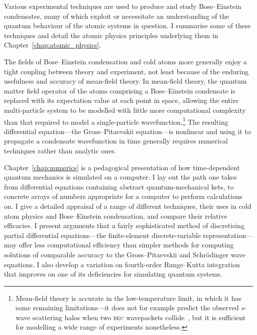 Various experimental techniques are used to produce and study Bose--Einstein condensates, many of which exploit or necessitate an understanding of the quantum behaviour of the atomic systems in question. I summarise some of these techniques and detail the atomic physics principles underlying them in Chapter~\ref{chap:atomic_physics}.

The fields of Bose--Einstein condensation and cold atoms more generally enjoy a tight coupling between theory and experiment, not least because of the enduring usefulness and accuracy of mean-field theory. In mean-field theory, the quantum matter field operator of the atoms comprising a Bose--Einstein condensate is replaced with its expectation value at each point in space, allowing the entire multi-particle system to be modelled with little more computational complexity than that required to model a single-particle wavefunction.\footnote{Mean-field theory is accurate in the low-temperature limit, in which it has some remaining limitations---it does not for example predict the observed $s$-wave scattering halos when two \textsc{bec} wavepackets collide~\cite{norrie_quantum_2006}, but it is sufficient for modelling a  wide range of experiments nonetheless.} The resulting differential equation---the Gross--Pitaevskii equation---is nonlinear and using it to propagate a condensate wavefunction in time generally requires numerical techniques rather than analytic ones.

Chapter~\ref{chap:numerics} is a pedagogical presentation of how time-dependent quantum mechanics is simulated on a computer. I lay out the path one takes from differential equations containing abstract quantum-mechanical kets, to concrete arrays of numbers appropriate for a computer to perform calculations on. I give a detailed appraisal of a range of different techniques, their uses in cold atom physics and Bose--Einstein condensation, and compare their relative efficacies. I present arguments that a fairly sophisticated method of discretising partial differential equations---the finite-element discrete-variable representation---may offer less computational efficiency than simpler methods for computing solutions of comparable accuracy to the Gross--Pitaevskii and Schr\"odinger wave equations. I also develop a variation on fourth-order Runge--Kutta integration that improves on one of its deficiencies for simulating quantum systems. 

